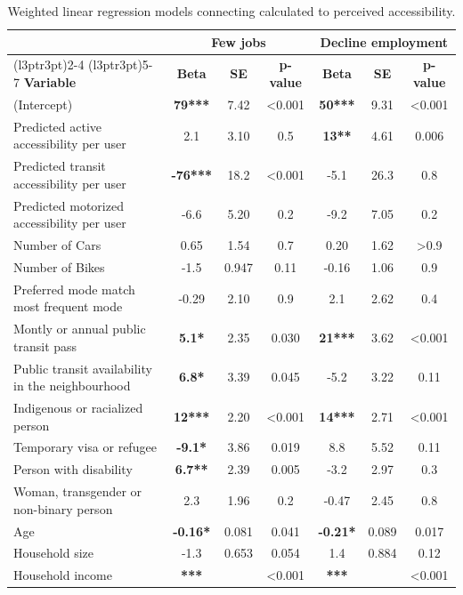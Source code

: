 \documentclass[preprint, 3p,
authoryear]{elsarticle} %
\begin{document}
\begin{table}

\caption{\label{tab:unnamed-chunk-6}\label{tab:linear_models}Weighted linear regression models connecting calculated to perceived accessibility.}
\centering
\begin{tabular}[t]{lcccccc}
\toprule
\multicolumn{1}{c}{ } & \multicolumn{3}{c}{\textbf{Few jobs}} & \multicolumn{3}{c}{\textbf{Decline employment}} \\
\cmidrule(l{3pt}r{3pt}){2-4} \cmidrule(l{3pt}r{3pt}){5-7}
\textbf{Variable} & \textbf{Beta} & \textbf{SE} & \textbf{p-value} & \textbf{Beta} & \textbf{SE} & \textbf{p-value}\\
\midrule
(Intercept) & \textbf{79***} & 7.42 & <0.001 & \textbf{50***} & 9.31 & <0.001\\
Predicted active accessibility per user & 2.1 & 3.10 & 0.5 & \textbf{13**} & 4.61 & 0.006\\
Predicted transit accessibility per user & \textbf{-76***} & 18.2 & <0.001 & -5.1 & 26.3 & 0.8\\
Predicted motorized accessibility per user & -6.6 & 5.20 & 0.2 & -9.2 & 7.05 & 0.2\\
Number of Cars & 0.65 & 1.54 & 0.7 & 0.20 & 1.62 & >0.9\\
\addlinespace
Number of Bikes & -1.5 & 0.947 & 0.11 & -0.16 & 1.06 & 0.9\\
Preferred mode match most frequent mode & -0.29 & 2.10 & 0.9 & 2.1 & 2.62 & 0.4\\
Montly or annual public transit pass & \textbf{5.1*} & 2.35 & 0.030 & \textbf{21***} & 3.62 & <0.001\\
Public transit availability in the neighbourhood & \textbf{6.8*} & 3.39 & 0.045 & -5.2 & 3.22 & 0.11\\
Indigenous or racialized person & \textbf{12***} & 2.20 & <0.001 & \textbf{14***} & 2.71 & <0.001\\
\addlinespace
Temporary visa or refugee & \textbf{-9.1*} & 3.86 & 0.019 & 8.8 & 5.52 & 0.11\\
Person with disability & \textbf{6.7**} & 2.39 & 0.005 & -3.2 & 2.97 & 0.3\\
Woman, transgender or non-binary person & 2.3 & 1.96 & 0.2 & -0.47 & 2.45 & 0.8\\
Age & \textbf{-0.16*} & 0.081 & 0.041 & \textbf{-0.21*} & 0.089 & 0.017\\
Household size & -1.3 & 0.653 & 0.054 & 1.4 & 0.884 & 0.12\\
\addlinespace
Household income & \textbf{***} &  & <0.001 & \textbf{***} &  & <0.001\\

\end{tabular}
\end{table}
\end{document}
